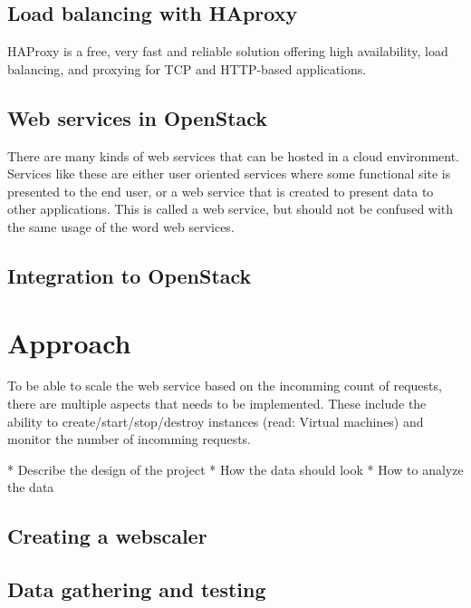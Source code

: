 \subsection{Load balancing with HAproxy}
HAProxy is a free, very fast and reliable solution offering high availability,
load balancing, and proxying for TCP and HTTP-based
applications. \cite{haproxy:2014}




\subsection{Web services in OpenStack}
There are many kinds of web services that can be hosted in a cloud environment.
Services like these are either user oriented services where some functional
site is presented to the end user, or a web service that is created to present
data to other applications. This is called a web service, but should not be
confused with the same usage of the word web services.

\subsection{Integration to OpenStack}

\section{Approach}
To be able to scale the web service based on the incomming count of requests,
there are multiple aspects that needs to be implemented. These include the
ability to create/start/stop/destroy instances (read: Virtual machines) and
monitor the number of incomming requests.


* Describe the design of the project
* How the data should look
* How to analyze the data

\subsection{Creating a webscaler}

\subsection{Data gathering and testing}


